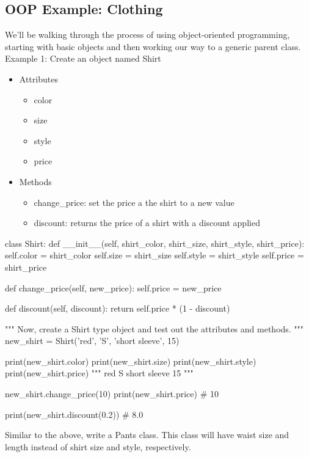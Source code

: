 \subsection{OOP Example: Clothing}
We'll be walking through the process of using object-oriented programming, starting with basic objects and then working our way to a generic parent class.
\\
Example 1: Create an object named Shirt
\begin{itemize}
	\item Attributes
	\begin{itemize}
		\item color
		\item size
		\item style
		\item price
	\end{itemize}
	\item Methods
	\begin{itemize}
		\item change\_price: set the price a the shirt to a new value
		\item discount: returns the price of a shirt with a discount applied
	\end{itemize}
\end{itemize}

\begin{python}
	class Shirt:
		def __init__(self, shirt_color, shirt_size, shirt_style, shirt_price):
			self.color = shirt_color
			self.size = shirt_size
			self.style = shirt_style
			self.price = shirt_price
		
		def change_price(self, new_price):
			self.price = new_price
		
		def discount(self, discount):
			return self.price * (1 - discount)
		
	"""
	Now, create a Shirt type object and test out the attributes and methods.
	"""
	new_shirt = Shirt('red', 'S', 'short sleeve', 15)
	
	print(new_shirt.color)
	print(new_shirt.size)
	print(new_shirt.style)
	print(new_shirt.price)
	"""
	red
	S
	short sleeve
	15
	"""
	
	new_shirt.change_price(10)
	print(new_shirt.price)
	# 10
	
	print(new_shirt.discount(0.2))
	# 8.0
\end{python}

Similar to the above, write a Pants class. This class will have waist size and length instead of shirt size and style, respectively.

